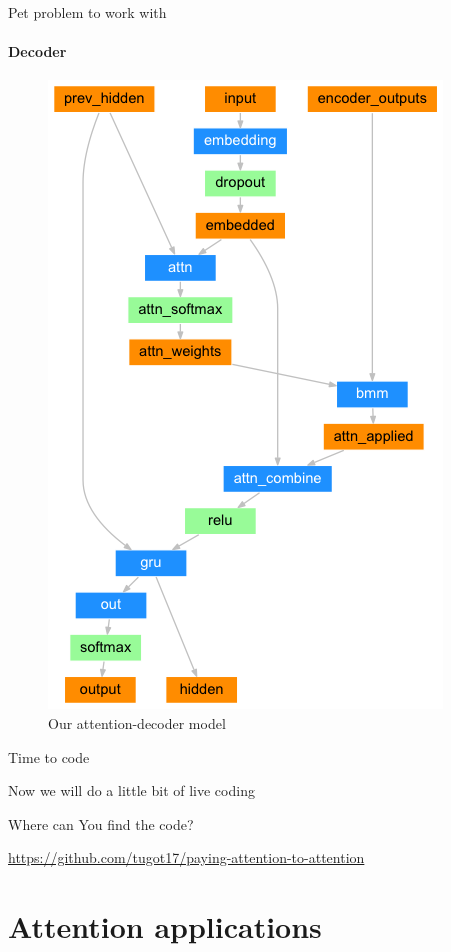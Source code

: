 \documentclass{beamer}
\begin{document}
\begin{frame}{Pet problem to work with}
\framesubtitle{Decoder}
    \begin{figure}
    \includegraphics[width = .3\textwidth]{images/attention-decoder-network.png}
    \caption{Our attention-decoder model\footnotemark[8]}
\end{figure}{}
\end{frame}


\begin{frame}{Time to code}

Now we will do a little bit of live coding

\begin{block}{Where can You find the code?}

\url{https://github.com/tugot17/paying-attention-to-attention}

\end{block}

    
\end{frame}

\section{Attention applications}
\end{document}
